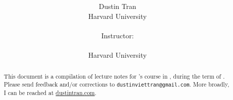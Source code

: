 \documentclass[12pt]{article}
\title{%
\textbf{\coursenum \coursetitle}
}
\author{
Dustin Tran \\
Harvard University \\
\\
Instructor: \\
\instructor \\
Harvard University \\
}
\begin{document}
\maketitle
\bigskip

\begin{abstract}
This document is a compilation of lecture notes for \instructor's
\coursenum course in \coursetitle, during the term of \term. Please
send feedback and/or corrections to \texttt{dustinviettran@gmail.com}.
More broadly, I can be reached at \url{dustintran.com}.
\end{abstract}


\clearpage
\glsresetall{}
\tableofcontents
\clearpage



\clearpage




\clearpage
\appendix

%
\end{document}
